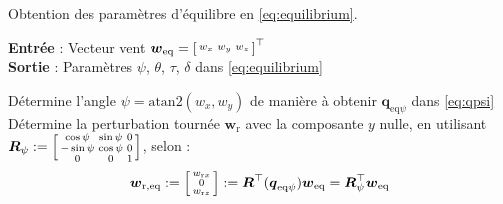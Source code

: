     \begin{algorithm}
    \caption{Obtention des paramètres d'équilibre en \eqref{eq:equilibrium}.}
    \label{alg:eq}
    \hspace*{.1cm} \textbf{Entrée} : Vecteur vent $\boldsymbol{w}_{\text{eq}} =\left[ \begin{smallmatrix}w_x & w_y & w_z \end{smallmatrix} \right]^\top$ \\
    \hspace*{.1cm} \textbf{Sortie} : Paramètres $\psi$, $\theta$, $\tau$, $\delta$ dans \eqref{eq:equilibrium}
    \begin{algorithmic}[1]
        \State Détermine l'angle $\psi = \text{atan2}(w_x, w_y)$ de manière à obtenir $\boldsymbol{q}_{\mathrm{eq}\psi}$ dans \eqref{eq:qpsi}  
        \State Détermine la perturbation tournée $\boldsymbol{w}_{\text{r}}$ avec la composante $y$ nulle, en utilisant $\boldsymbol{R}_{\psi}:= \left[ \begin{smallmatrix} \cos \psi & \sin \psi & 0 \\ -\sin \psi & \cos \psi & 0 \\ 0 & 0 & 1  \end{smallmatrix} \right]$, selon :
        \begin{align}
        \label{eq:wh}
        \boldsymbol{w}_{\mathrm{r,eq}} := \left[ \begin{smallmatrix}w_{\text{r}x} \\ 0 \\w_{\text{r}z} \end{smallmatrix} \right] :=  \boldsymbol{R}^\top(\boldsymbol{q}_{\mathrm{eq}\psi}) \boldsymbol{w}_{\mathrm{eq}} = \boldsymbol{R}^\top_{\psi} \boldsymbol{w}_{\mathrm{eq}}
        \end{align}


\end{algorithmic}
\end{algorithm}
